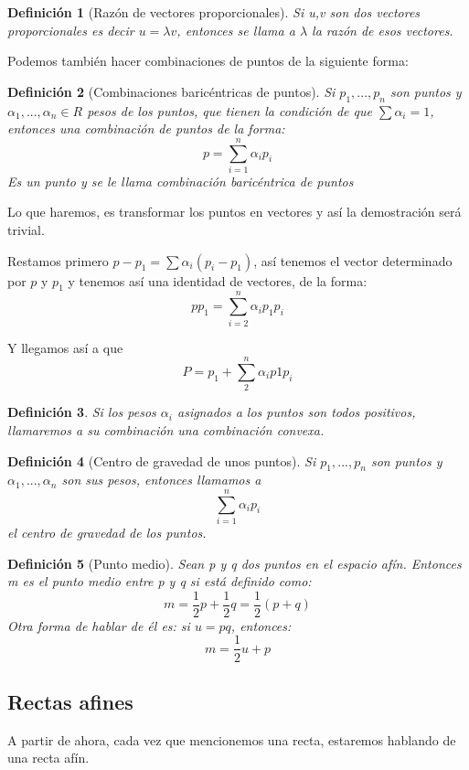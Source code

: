 \documentclass[11pt, a4paper, titlepage]{article}
\makeatletter
\renewenvironment{proof}[1][\proofname] {\vspace{-15pt}\par\pushQED{\qed}\normalfont\topsep6\p@\@plus6\p@\relax\trivlist\item[\hskip\labelsep\it#1\@addpunct{.}]\ignorespaces}{\popQED\endtrivlist\@endpefalse}
\theoremstyle{theorem-style}
\theoremstyle{definition-style}
\newtheorem*{ndef}{Definición}
\theoremstyle{remark-style}
\theoremstyle{example-style}
\makeatother
\begin{document}
\begin{ndef}[Razón de vectores proporcionales]
	Si u,v son dos vectores proporcionales es decir $u = \lambda v$, entonces se llama a $\lambda$ la razón de esos vectores.
\end{ndef}
Podemos también hacer combinaciones de puntos de la siguiente forma:
\begin{ndef}[Combinaciones baricéntricas de puntos]
	Si $p_1,...,p_n$ son puntos y $\alpha_1,...,\alpha_n \in R$ pesos de los puntos, que tienen la condición de que $\sum \alpha_i = 1$, entonces una combinación de puntos de la forma:
	\[
	p = \sum_{i=1}^n \alpha_i p_i
	\]
	Es un punto y se le llama combinación baricéntrica de puntos
\end{ndef}
\begin{proof}
	Lo que haremos, es transformar los puntos en vectores y así la demostración será trivial.
	
	Restamos primero $p-p_1 = \sum \alpha_i(p_i-p_1)$, así tenemos el vector determinado por $p$ y $p_1$ y tenemos así una identidad de vectores, de la forma:
	\[
	pp_1 = \sum_{i=2}^n \alpha_i p_1p_i
	\]
	
	Y llegamos así a que
	\[
	P = p_1 + \sum_2^n \alpha_i p1p_i
	\]
\end{proof}

\begin{ndef}
	Si los pesos $\alpha_i$ asignados a los puntos son todos positivos, llamaremos a su combinación una combinación convexa.
\end{ndef}

\begin{ndef}[Centro de gravedad de unos puntos]
	Si $p_1,...,p_n$ son puntos y $\alpha_1,...,\alpha_n$ son sus pesos, entonces llamamos a
	\[
	\sum_{i=1}^n \alpha_ip_i
	\]
	el centro de gravedad de los puntos.
\end{ndef}

\begin{ndef}[Punto medio]
Sean p y q dos puntos en el espacio afín. Entonces m es el punto medio entre p y q si está definido como:
\[
m = \dfrac{1}{2} p + \dfrac{1}{2}q = \dfrac{1}{2}(p+q)
\]
Otra forma de hablar de él es: si $u = pq$, entonces:
\[
m = \dfrac{1}{2}u + p
\]

\end{ndef}

\subsection{Rectas afines}
A partir de ahora, cada vez que mencionemos una recta, estaremos hablando de una recta afín.
\end{document}
